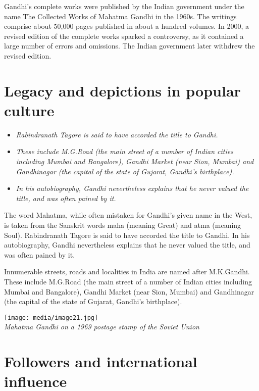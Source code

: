Gandhi's complete works were published by the Indian government under
the name The Collected Works of Mahatma Gandhi in the 1960s. The
writings comprise about 50,000 pages published in about a hundred
volumes. In 2000, a revised edition of the complete works sparked a
controversy, as it contained a large number of errors and omissions. The
Indian government later withdrew the revised edition.

\section{Legacy and depictions in popular
culture}\label{legacy-and-depictions-in-popular-culture}

\begin{itemize}
\item
  \emph{Rabindranath Tagore is said to have accorded the title to
  Gandhi.}
\item
  \emph{These include M.G.Road (the main street of a number of Indian
  cities including Mumbai and Bangalore), Gandhi Market (near Sion,
  Mumbai) and Gandhinagar (the capital of the state of Gujarat, Gandhi's
  birthplace).}
\item
  \emph{In his autobiography, Gandhi nevertheless explains that he never
  valued the title, and was often pained by it.}
\end{itemize}

The word Mahatma, while often mistaken for Gandhi's given name in the
West, is taken from the Sanskrit words maha (meaning Great) and atma
(meaning Soul). Rabindranath Tagore is said to have accorded the title
to Gandhi. In his autobiography, Gandhi nevertheless explains that he
never valued the title, and was often pained by it.

Innumerable streets, roads and localities in India are named after
M.K.Gandhi. These include M.G.Road (the main street of a number of
Indian cities including Mumbai and Bangalore), Gandhi Market (near Sion,
Mumbai) and Gandhinagar (the capital of the state of Gujarat, Gandhi's
birthplace).

\texttt{[image: media/image21.jpg]}\\
\emph{Mahatma Gandhi on a 1969 postage stamp of the Soviet Union}

\section{Followers and international
influence}\label{followers-and-international-influence}

